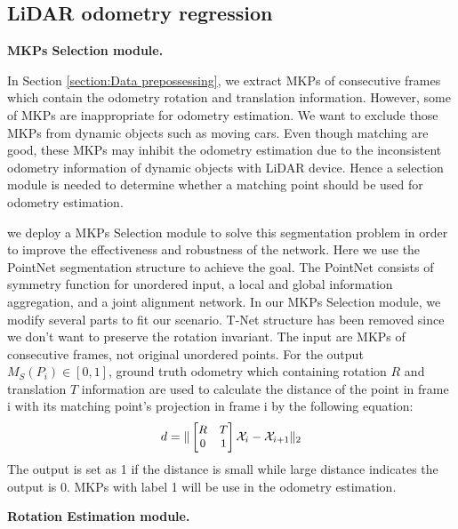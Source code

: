 \documentclass[sigconf]{acmart}
\newcommand{\bfsection}[1]{\vspace*{0.1cm}\noindent\textbf{#1.}}
\begin{document}
\subsection{LiDAR odometry regression}
\label{section:train lodo}
\bfsection{MKPs Selection module}

In Section \ref{section:Data prepossessing}, we extract MKPs of consecutive frames which contain the odometry rotation and translation information. However, some of MKPs are inappropriate for odometry estimation. We want to exclude those MKPs from dynamic objects such as moving cars. Even though matching are good, these MKPs may inhibit the odometry estimation due to the inconsistent odometry information of dynamic objects with LiDAR device. Hence a selection module is needed to determine whether a matching point should be used for odometry estimation. 

we deploy a MKPs Selection module to solve this segmentation problem in order to improve the effectiveness and robustness of the network. Here we use the PointNet segmentation structure to achieve the goal. The PointNet consists of symmetry function for unordered input, a local and global information aggregation, and a joint alignment network. In our MKPs Selection module, we modify several parts to fit our scenario. T-Net structure has been removed since we don't want to preserve the rotation invariant. The input are MKPs of consecutive frames, not original unordered points. For the output $M_S(P_i) \in [0,1]$, ground truth odometry which containing rotation $R$ and translation $T$ information are used to calculate the distance of the point in frame i with its matching point’s projection in frame i by the following equation: 
\begin{align}
\small
    d =\| \begin{bmatrix}
            R & T \\
            0 & 1 
            \end{bmatrix}  \mathcal{X}_i - \mathcal{X}_{i+1} \|_2 
\end{align}
The output is set as 1 if the distance is small while large distance indicates the output is 0. MKPs with label 1 will be use in the odometry estimation.

\bfsection{Rotation Estimation module}
\end{document}
